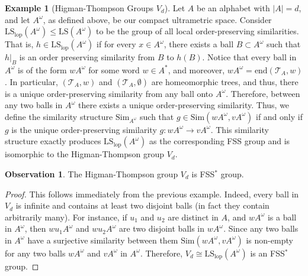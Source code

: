 \documentclass[12pt]{amsart}
\numberwithin{equation}{subsection}
\theoremstyle{definition}
\newtheorem{observation}[theorem]{Observation}
\theoremstyle{definition}
\newtheorem{example}[theorem]{Example}
\theoremstyle{remark}
\begin{document}
\begin{example}[Higman-Thompson Groups $V_d$]\label{ex:ThompsonGroups}
Let $A$ be an alphabet with $\vert A\vert =d$, and let $A^\omega$, as defined above, be our compact ultrametric space. Consider $\text{LS}_{\text{lop}}(A^\omega) \leq \text{LS}(A^\omega)$ to be the group of all local order-preserving similarities. That is, $h \in \text{LS}_{\text{lop}}(A^\omega)$ if for every $x \in A^\omega$, there exists a ball $B \subset A^\omega$ such that $h\vert_B$ is an order preserving similarity from $B$ to $h(B)$.
Notice that every ball in $A^\omega$ is of the form $wA^\omega$ for some word $w \in A^*$, and moreover, $wA^\omega = \text{end}(\mathcal T_A,w)$. In particular, $(\mathcal T_A,w)$ and $(\mathcal T_A,\emptyset)$ are homeomorphic trees, and thus, there is a unique order-preserving similarity from any ball onto $A^\omega$. Therefore, between any two balls in $A^\omega$ there exists a unique order-preserving similarity. Thus, we define the similarity structure  $\text{Sim}_{A^\omega}$ such that $g \in \text{Sim}(wA^\omega,vA^\omega)$ if and only if $g$ is the unique order-preserving similarity $g:wA^\omega \rightarrow vA^\omega$. This similarity structure exactly produces $\text{LS}_{\text{lop}}(A^\omega)$ as the corresponding FSS group and is isomorphic to the Higman-Thompson group $V_d$. 
    
\end{example}

\begin{observation}\label{cor:VisFSS*}
    The Higman-Thompson group $V_d$ is FSS$^*$ group.
\end{observation}

\begin{proof}
    This follows immediately from the previous example. Indeed, every ball in $V_d$ is infinite and contains at least two disjoint balls (in fact they contain arbitrarily many). For instance, if $u_1$ and $u_2$ are distinct in $A$, and $wA^\omega$ is a ball in $A^\omega$, then $wu_1A^\omega$ and $wu_2A^\omega$ are two disjoint balls in $wA^\omega$. Since any two balls in $A^\omega$ have a surjective similarity between them $\text{Sim}(wA^\omega,vA^\omega)$ is non-empty for any two balls $wA^\omega$ and $vA^\omega$ in $A^\omega$. Therefore, $V_d \cong \text{LS}_{\text{lop}}(A^\omega)$ is an FSS$^*$ group. 
\end{proof}
\end{document}
